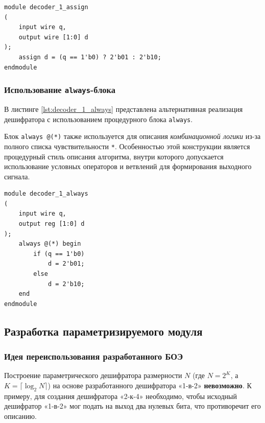 \begin{code}
\caption{Реализация дешифратора через конструкцию \texttt{assign}.}
\label{lst:decoder_1_assign}
\begin{verbatim}
module decoder_1_assign
(
    input wire q,
    output wire [1:0] d
);
    assign d = (q == 1'b0) ? 2'b01 : 2'b10;
endmodule
\end{verbatim}
\end{code}

\subsubsection{Использование \texttt{always}-блока}

В листинге \ref{lst:decoder_1_always} представлена альтернативная реализация дешифратора с использованием процедурного блока \texttt{always}.

Блок \texttt{always @(*)} также используется для описания \textit{комбинационной логики} из-за полного списка чувствительности \texttt{*}. Особенностью этой конструкции является процедурный стиль описания алгоритма, внутри которого допускается использование условных операторов и ветвлений для формирования выходного сигнала.

\begin{code}
\caption{Реализация дешифратора через \texttt{always}-блок.}
\label{lst:decoder_1_always}
\begin{verbatim}
module decoder_1_always
(
    input wire q,
    output reg [1:0] d
);    
    always @(*) begin
        if (q == 1'b0)
            d = 2'b01;
        else
            d = 2'b10;
    end
endmodule
\end{verbatim}
\end{code}

\subsection{Разработка параметризируемого модуля}

\subsubsection{Идея переиспользования разработанного БОЭ}

Построение параметрического дешифратора размерности $N$ (где $N = 2^K$, а $K = \lceil\log_2 N\rceil$) на основе разработанного дешифратора «1-в-2» \textbf{невозможно}. К примеру, для создания дешифратора «2-к-4» необходимо, чтобы исходный дешифратор «1-в-2» мог подать на выход два нулевых бита, что противоречит его описанию.

